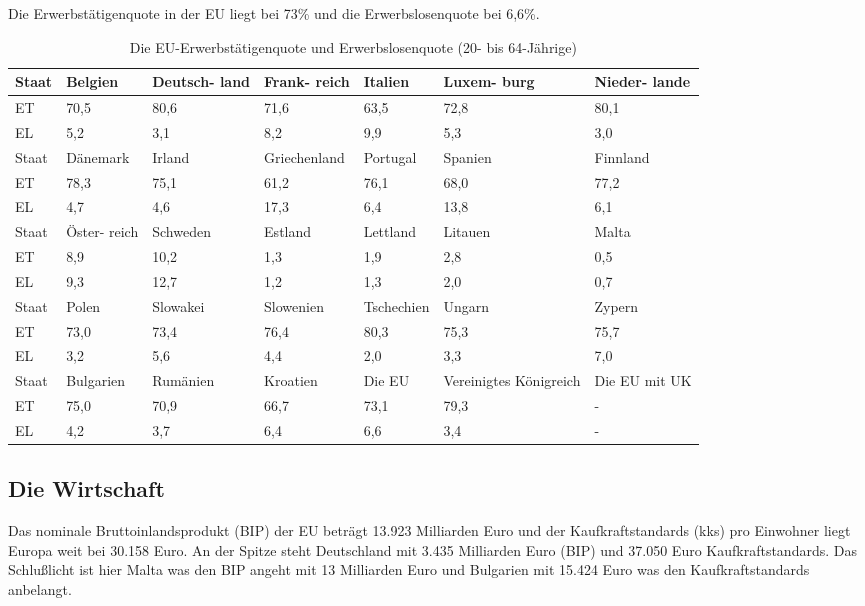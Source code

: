 Die Erwerbstätigenquote in der EU liegt bei 73\% und die Erwerbslosenquote bei 6,6\%.
\noindent
{}
\begin{table}[ht]
\caption{Die EU-Erwerbstätigenquote und Erwerbslosenquote (20- bis 64-Jährige)}
\label{tab:euErwerbtaetigenquote}
\centering
\begin{tabular}{s|g|g|g|g|g|g}
\hline
Staat &Belgien &Deutsch- land &Frank- reich &Italien &Luxem- burg &Nieder- lande \\
\hline
ET~ &70,5 &80,6 &71,6 &63,5 &72,8 &80,1 \\
\hline
EL~ &5,2 &3,1 &8,2 &9,9 &5,3 &3,0 \\
\hline
\hline
Staat &Dänemark &Irland &Griechenland &Portugal &Spanien &Finnland \\
\hline
ET &78,3 &75,1 &61,2 &76,1 &68,0 &77,2 \\
\hline
EL &4,7 &4,6 &17,3 &6,4 &13,8 &6,1 \\
\hline
\hline
Staat &Öster- reich &Schweden &Estland &Lettland &Litauen &Malta \\
\hline
ET &8,9 &10,2 &1,3 &1,9 &2,8 &0,5 \\
\hline
EL &9,3 &12,7 &1,2 &1,3 &2,0 &0,7 \\
\hline
\hline
Staat &Polen &Slowakei &Slowenien &Tschechien &Ungarn &Zypern\\
\hline
ET &73,0 &73,4 &76,4 &80,3 &75,3 &75,7 \\
\hline
EL &3,2 &5,6 &4,4 &2,0 &3,3 &7,0 \\
\hline
\hline
Staat &Bulgarien &Rumänien &Kroatien &Die EU &Vereinigtes Königreich &Die EU mit UK\\
\hline
ET &75,0 &70,9 &66,7 &73,1 &79,3 &- \\
\hline
EL &4,2 &3,7 &6,4 &6,6 &3,4 &- \\
\hline
\end{tabular}
\end{table}

\subsection{Die Wirtschaft}\label{subsec:EuroWirtschaft}

Das nominale Bruttoinlandsprodukt (BIP) der EU beträgt 13.923 Milliarden Euro und der Kaufkraftstandards (\gls{kks}) pro Einwohner liegt Europa weit bei 30.158 Euro. An der Spitze steht Deutschland mit 3.435 Milliarden Euro (BIP) und 37.050 Euro Kaufkraftstandards. Das Schlußlicht ist hier Malta was den BIP angeht mit 13 Milliarden Euro und Bulgarien mit 15.424 Euro was den Kaufkraftstandards anbelangt. 